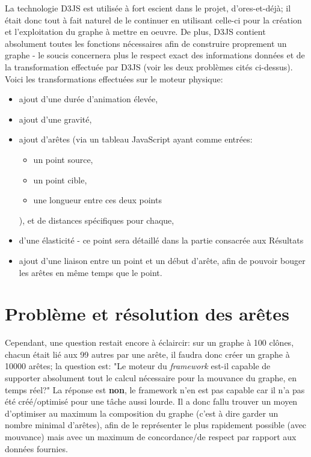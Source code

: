 \documentclass[12pt]{report}
\begin{document}
\begin{spacing}{1.2}
La technologie D3JS est utilisée à fort escient dans le projet, d'ores-et-déjà; il était donc tout à fait naturel de le continuer en utilisant celle-ci pour la création et l'exploitation du graphe à mettre en oeuvre.
De plus, D3JS contient absolument toutes les fonctions nécessaires afin de construire proprement un graphe - le soucis concernera plus le respect exact des informations données et de la transformation effectuée par D3JS (voir les deux problèmes cités ci-dessus).
\newline
Voici les transformations effectuées sur le moteur physique:
\begin{itemize}
\item{ajout d'une durée d'animation élevée,}
\item{ajout d'une gravité,}
\item{ajout d'arêtes (via un tableau JavaScript ayant comme entrées:	
\begin{itemize}
\item{un point source,}
\item{un point cible,}
\item{une longueur entre ces deux points}
\end{itemize}
),
et de distances spécifiques pour chaque,}
\item{d'une élasticité - ce point sera détaillé dans la partie consacrée aux Résultats}
\item{ajout d'une liaison entre un point et un début d'arête, afin de pouvoir bouger les arêtes en même temps que le point.}
\end{itemize}

\section{Problème et résolution des arêtes}

Cependant, une question restait encore à éclaircir: sur un graphe à 100 clônes, chacun était lié aux 99 autres par une arête, il faudra donc créer un graphe à 10000 arêtes; la question est: "Le moteur du \textit{framework} est-il capable de supporter absolument tout le calcul nécessaire pour la mouvance du graphe, en temps réel?"
\newline
La réponse est \textbf{non}, le framework n'en est pas capable car il n'a pas été créé/optimisé pour une tâche aussi lourde.
\newline
Il a donc fallu trouver un moyen d'optimiser au maximum la composition du graphe (c'est à dire garder un nombre minimal d'arêtes), afin de le représenter le plus rapidement possible (avec mouvance) mais avec un maximum de concordance/de respect par rapport aux données fournies.


\end{spacing}
\end{document}
